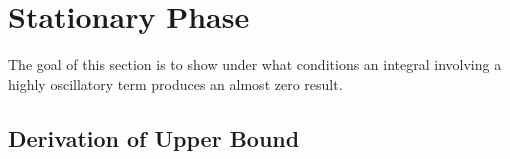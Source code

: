 \documentclass{article}
\theoremstyle{plain}
\begin{document}
\section{Stationary Phase}\label{sec_stationaryPhase}


%

The goal of this section is to show under what conditions an integral involving a
highly oscillatory term produces an almost zero result.



\subsection{Derivation of Upper Bound}
\end{document}
